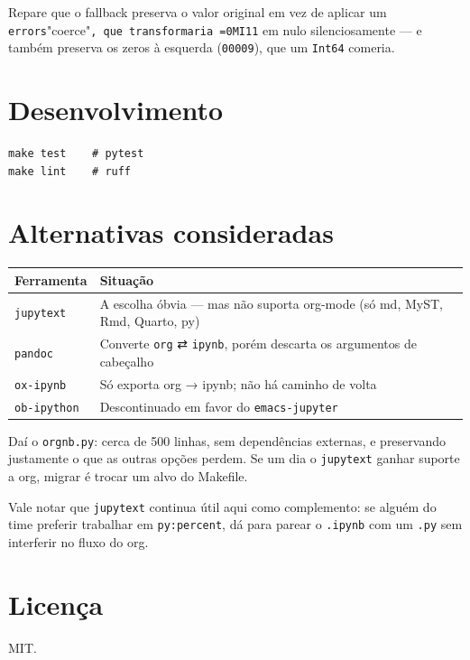 \documentclass[11pt]{article}
\begin{document}
Repare que o fallback preserva o valor original em vez de aplicar um
\texttt{errors}"coerce"\texttt{, que transformaria =0MI11} em nulo silenciosamente — e também
preserva os zeros à esquerda (\texttt{00009}), que um \texttt{Int64} comeria.
\section*{Desenvolvimento}
\label{sec:org254ff0b}

\begin{verbatim}
make test    # pytest
make lint    # ruff
\end{verbatim}
\section*{Alternativas consideradas}
\label{sec:org52b6c48}
\begin{center}
\begin{tabular}{ll}
Ferramenta & Situação\\
\hline
\texttt{jupytext} & A escolha óbvia — mas não suporta org-mode (só md, MyST, Rmd, Quarto, py)\\
\texttt{pandoc} & Converte \texttt{org} ⇄ \texttt{ipynb}, porém descarta os argumentos de cabeçalho\\
\texttt{ox-ipynb} & Só exporta org → ipynb; não há caminho de volta\\
\texttt{ob-ipython} & Descontinuado em favor do \texttt{emacs-jupyter}\\
\end{tabular}
\end{center}

Daí o \texttt{orgnb.py}: cerca de 500 linhas, sem dependências externas, e preservando
justamente o que as outras opções perdem. Se um dia o \texttt{jupytext} ganhar suporte
a org, migrar é trocar um alvo do Makefile.

Vale notar que \texttt{jupytext} continua útil aqui como complemento: se alguém do
time preferir trabalhar em \texttt{py:percent}, dá para parear o \texttt{.ipynb} com um
\texttt{.py} sem interferir no fluxo do org.
\section*{Licença}
\label{sec:org7344237}

MIT.
\end{document}
